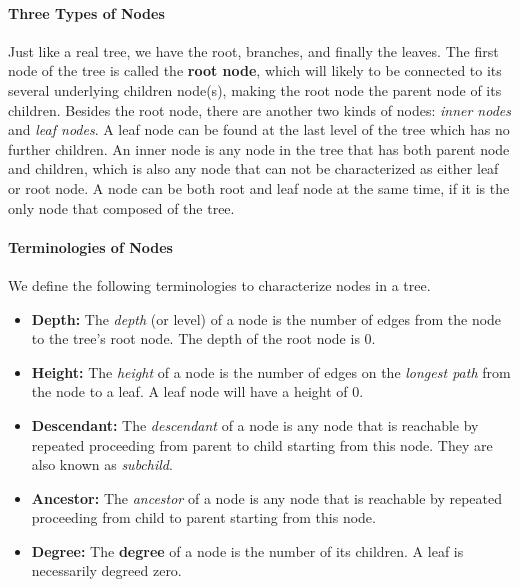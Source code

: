 \documentclass[../main.tex]{subfiles}
\begin{document}
\paragraph{Three Types of Nodes} Just like a real tree, we have the root, branches, and finally the leaves. The first node of the tree is called the \textbf{root node}, which will likely to be connected to its several underlying children node(s), making the root node the parent node of its children. Besides the root node, there are another two kinds of nodes: \textit{inner nodes} and \textit{leaf nodes}. A leaf node can be found at the last level of the tree which has no further children.  An inner node is any node in the tree that has both parent node and children, which is also any node that can not be characterized as either leaf or root node. A node can be both root and leaf node at the same time, if it is the only node that composed of the tree. 

\paragraph{Terminologies of Nodes} We define the following terminologies to characterize nodes in a tree.
\begin{itemize}
    \item \textbf{Depth:} The \textit{depth} (or level) of a node is the number of edges from the node to the tree's root node. The depth of the root node is $0$. %
    \item \textbf{Height:} The \textit{height} of a node is the number of edges on the \textit{longest path} from the node to a leaf. A leaf node will have a height of $0$.
    \item \textbf{Descendant:} The \textit{descendant} of a node is any node that is reachable by repeated proceeding from parent to child starting from this node. They are also known as \textit{subchild}.
    \item \textbf{Ancestor:} The \textit{ancestor} of a node is any node that is reachable by repeated proceeding from child to parent starting from this node.
    \item \textbf{Degree:} The \textbf{degree} of a node is the number of its children. A leaf is necessarily degreed zero. 
\end{itemize}
\end{document}
